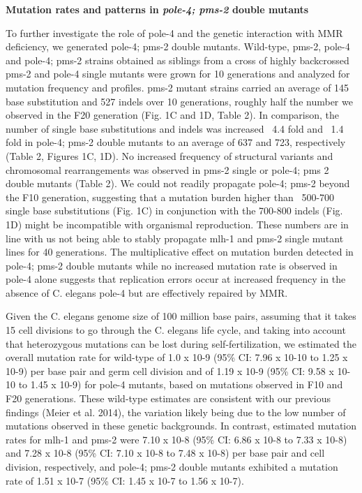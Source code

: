 \textbf{Mutation rates and patterns in \textit{pole-4; pms-2} double mutants}

To further investigate the role of pole-4 and the genetic interaction with 
MMR deficiency, we generated pole-4; pms-2 double mutants. Wild-type, pms-2, 
pole-4 and pole-4; pms-2 strains obtained as siblings from a cross of highly 
backcrossed pms-2 and pole-4 single mutants were grown for 10 generations and 
analyzed for mutation frequency and profiles. pms-2 mutant strains carried an 
average of 145 base substitution and 527 indels over 10 generations, roughly 
half the number we observed in the F20 generation (Fig. 1C and 1D, Table 2). 
In comparison, the number of single base substitutions and indels was increased 
~4.4 fold and ~1.4 fold in pole-4; pms-2 double mutants to an average of 637 and 723, 
respectively (Table 2, Figures 1C, 1D). No increased frequency of structural 
variants and chromosomal rearrangements was observed in pms-2 single or pole-4; pms 2 
double mutants (Table 2). We could not readily propagate pole-4; pms-2 beyond the 
F10 generation, suggesting that a mutation burden higher than ~500-700 single base 
substitutions (Fig. 1C) in conjunction with the 700-800 indels (Fig. 1D) might be 
incompatible with organismal reproduction. These numbers are in line with us not 
being able to stably propagate mlh-1 and pms-2 single mutant lines for 40 generations. 
The multiplicative effect on mutation burden detected in pole-4; pms-2 double mutants 
while no increased mutation rate is observed in pole-4 alone suggests that replication 
errors occur at increased frequency in the absence of C. elegans pole-4 but are 
effectively repaired by MMR.


Given the C. elegans genome size of 100 million base pairs, assuming that it 
takes 15 cell divisions to go through the C. elegans life cycle, and taking 
into account that heterozygous mutations can be lost during self-fertilization, 
we estimated the overall mutation rate for wild-type of 1.0 x 10-9  
(95\% CI: 7.96 x 10-10 to 1.25 x 10-9) per base pair and germ cell division 
and of 1.19 x 10-9 (95\% CI: 9.58 x 10-10 to 1.45 x 10-9) for pole-4 mutants, 
based on mutations observed in F10 and F20 generations. These wild-type 
estimates are consistent with our previous findings (Meier et al. 2014), the 
variation likely being due to the low number of mutations observed in these 
genetic backgrounds. In contrast, estimated mutation rates for mlh-1 and pms-2 
were 7.10 x 10-8 (95\% CI: 6.86 x 10-8 to 7.33 x 10-8)  and 7.28 x 10-8 
(95\% CI: 7.10 x 10-8 to 7.48 x 10-8) per base pair and cell division, respectively, 
and pole-4; pms-2 double mutants exhibited a mutation rate of 1.51 x 10-7 
(95\% CI: 1.45 x 10-7 to 1.56 x 10-7).



